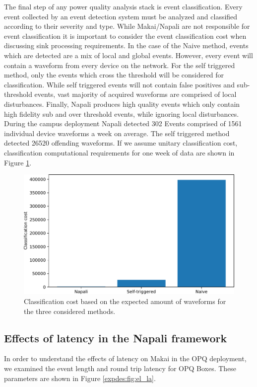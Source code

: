 The final step of any power quality analysis stack is event classification.
Every event collected by an event detection system must be analyzed and classified according to their severity and type.
While Makai/Napali are not responsible for event classification it is important to consider the event classification cost when discussing sink processing requirements.
In the case of the Naive method, events which are detected are a mix of local and global events.
However, every event will contain a waveform from every device on the network.
For the self triggered method, only the events which cross the threshold will be considered for classification.
While self triggered events will not contain false positives and sub-threshold events, vast majority of acquired waveforms are comprised of local disturbances.
Finally, Napali produces high quality events which only contain high fidelity sub and over threshold events, while ignoring local disturbances.
During the campus deployment Napali detected 302 Events comprised of 1561 individual device waveforms a week on average.
The self triggered method detected 26520 offending waveforms.
If we assume unitary classification cost, classification computational requirements for one week of data are shown in Figure \ref{expdes:fig:classification}.
\begin{figure}[h]
    \centering
    \includegraphics[width=0.8\linewidth]{img/napali_eval/classification_cost.pdf}
    \caption{Classification cost based on the expected amount of waveforms for the three considered methods.}
    \label{expdes:fig:classification}
\end{figure}


\subsection{Effects of latency in the Napali framework} \label{iexp:sec:lat}

In order to understand the effects of latency on Makai in the OPQ deployment, we examined the event length and round trip latency for OPQ Boxes.
These parameters are shown in Figure \ref{expdes:fig:el_la}.

